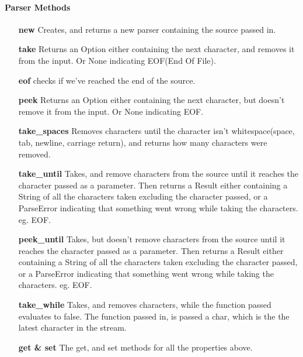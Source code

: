 \paragraph{Parser Methods}
\begin{itemize}
    
    \item[\textbf{new}] Creates, and returns a new parser containing the source passed in.
    
    \item[\textbf{take}] Returns an Option either containing the next character, and removes it from the input. Or None indicating EOF(End Of File).
    
    \item[\textbf{eof}] checks if we've reached the end of the source.
    
    \item[\textbf{peek}] Returns an Option either containing the next character, but doesn't remove it from the input. Or None indicating EOF.

    \item[\textbf{take\_spaces}] Removes characters until the character isn't whitespace(space, tab, newline, carriage return), and returns how many characters were removed.

    \item[\textbf{take\_until}] Takes, and remove characters from the source until it reaches the character passed as a parameter. Then returns a Result either containing a String of all the characters taken excluding the character passed, or a ParseError indicating that something went wrong while taking the characters. eg. EOF.

    \item[\textbf{peek\_until}] Takes, but doesn't remove characters from the source until it reaches the character passed as a parameter. Then returns a Result either containing a String of all the characters taken excluding the character passed, or a ParseError indicating that something went wrong while taking the characters. eg. EOF.
    
    \item[\textbf{take\_while}] Takes, and removes characters, while the function passed evaluates to false. The function passed in, is passed a char, which is the the latest character in the stream.
    
    \item[\textbf{get \& set}] The get, and set methods for all the properties above.
\end{itemize}

